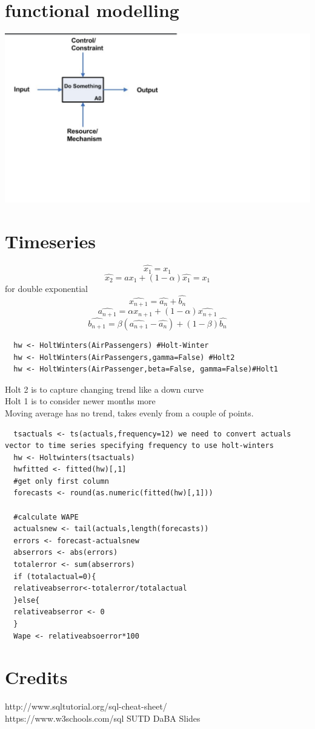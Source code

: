 \documentclass{article}
\begin{document}
\section{functional modelling}
\includegraphics{idef}
\section{Timeseries}
$$
\hat{x_1}=x_1
$$
$$
\hat{x_2}=ax_1+(1-\alpha)\hat{x_1}=x_1
$$
for double exponential
$$
\hat{x_{n+1}}=\hat{a_n}+\hat{b_n}
$$
$$
\hat{a_{n+1}}=\alpha x_{n+1}+(1-\alpha)\hat{x_{n+1}}
$$
$$
\hat{b_{n+1}}=\beta(\hat{a_{n+1}}-\hat{a_{n}})+(1-\beta)\hat{b_n}
$$
\begin{verbatim}
  hw <- HoltWinters(AirPassengers) #Holt-Winter
  hw <- HoltWinters(AirPassengers,gamma=False) #Holt2
  hw <- HoltWinters(AirPassenger,beta=False, gamma=False)#Holt1
\end{verbatim}
Holt 2 is to capture changing trend like a down curve\\
Holt 1 is to consider newer months more\\
Moving average has no trend, takes evenly from a couple of points.\\
\begin{verbatim}
  tsactuals <- ts(actuals,frequency=12) we need to convert actuals vector to time series specifying frequency to use holt-winters
  hw <- Holtwinters(tsactuals)
  hwfitted <- fitted(hw)[,1]
  #get only first column
  forecasts <- round(as.numeric(fitted(hw)[,1]))

  #calculate WAPE
  actualsnew <- tail(actuals,length(forecasts))
  errors <- forecast-actualsnew
  abserrors <- abs(errors)
  totalerror <- sum(abserrors)
  if (totalactual=0){
  relativeabserror<-totalerror/totalactual
  }else{
  relativeabserror <- 0
  }
  Wape <- relativeabsoerror*100
\end{verbatim}
\section{Credits}
http://www.sqltutorial.org/sql-cheat-sheet/\\
https://www.w3schools.com/sql
SUTD DaBA Slides
\end{document}
